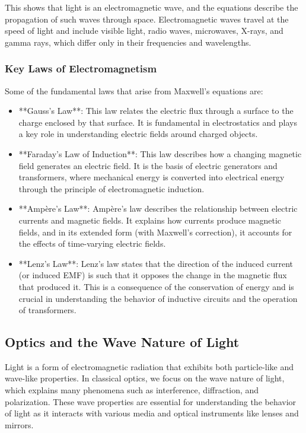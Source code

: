 \documentclass{article}
\begin{document}
This shows that light is an electromagnetic wave, and the equations describe the propagation of such waves through space. Electromagnetic waves travel at the speed of light and include visible light, radio waves, microwaves, X-rays, and gamma rays, which differ only in their frequencies and wavelengths.

\subsubsection*{Key Laws of Electromagnetism}

Some of the fundamental laws that arise from Maxwell's equations are:

\begin{itemize}
    \item **Gauss's Law**: This law relates the electric flux through a surface to the charge enclosed by that surface. It is fundamental in electrostatics and plays a key role in understanding electric fields around charged objects.
    
    \item **Faraday's Law of Induction**: This law describes how a changing magnetic field generates an electric field. It is the basis of electric generators and transformers, where mechanical energy is converted into electrical energy through the principle of electromagnetic induction.

    \item **Ampère’s Law**: Ampère's law describes the relationship between electric currents and magnetic fields. It explains how currents produce magnetic fields, and in its extended form (with Maxwell’s correction), it accounts for the effects of time-varying electric fields.
    
    \item **Lenz’s Law**: Lenz’s law states that the direction of the induced current (or induced EMF) is such that it opposes the change in the magnetic flux that produced it. This is a consequence of the conservation of energy and is crucial in understanding the behavior of inductive circuits and the operation of transformers.

\end{itemize}

\subsection{Optics and the Wave Nature of Light}

Light is a form of electromagnetic radiation that exhibits both particle-like and wave-like properties. In classical optics, we focus on the wave nature of light, which explains many phenomena such as interference, diffraction, and polarization. These wave properties are essential for understanding the behavior of light as it interacts with various media and optical instruments like lenses and mirrors.
\end{document}
